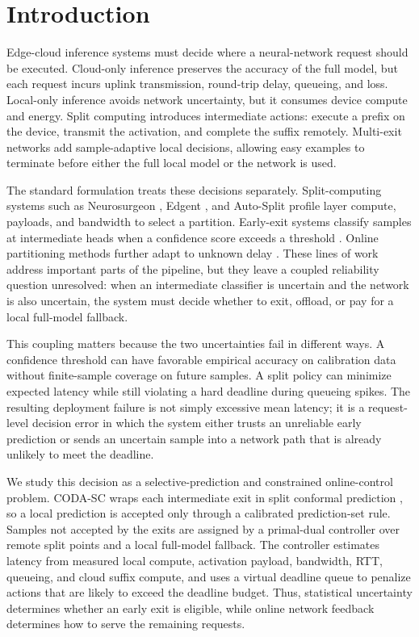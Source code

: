 \documentclass[11pt]{article}
\begin{document}
\section{Introduction}

Edge-cloud inference systems must decide where a neural-network request should
be executed. Cloud-only inference preserves the accuracy of the full model, but
each request incurs uplink transmission, round-trip delay, queueing, and loss.
Local-only inference avoids network uncertainty, but it consumes device compute
and energy. Split computing introduces intermediate actions: execute a prefix on
the device, transmit the activation, and complete the suffix remotely. Multi-exit
networks add sample-adaptive local decisions, allowing easy examples to terminate
before either the full local model or the network is used.

The standard formulation treats these decisions separately. Split-computing
systems such as Neurosurgeon \citep{kang2017neurosurgeon}, Edgent
\citep{li2019edgent}, and Auto-Split \citep{banitalebi2021autosplit} profile
layer compute, payloads, and bandwidth to select a partition. Early-exit systems
classify samples at intermediate heads when a confidence score exceeds a
threshold \citep{teerapittayanon2017ddnn, teerapittayanon2016branchynet,
matsubara2022split}. Online partitioning methods further adapt to unknown delay
\citep{saxena2025aodpart}. These lines of work address important parts of the
pipeline, but they leave a coupled reliability question unresolved: when an
intermediate classifier is uncertain and the network is also uncertain, the
system must decide whether to exit, offload, or pay for a local full-model
fallback.

This coupling matters because the two uncertainties fail in different ways. A
confidence threshold can have favorable empirical accuracy on calibration data
without finite-sample coverage on future samples. A split policy can minimize
expected latency while still violating a hard deadline during queueing spikes.
The resulting deployment failure is not simply excessive mean latency; it is a
request-level decision error in which the system either trusts an unreliable
early prediction or sends an uncertain sample into a network path that is already
unlikely to meet the deadline.

We study this decision as a selective-prediction and constrained online-control
problem. CODA-SC wraps each intermediate exit in split conformal prediction
\citep{angelopoulos2021gentle}, so a local prediction is accepted only through a
calibrated prediction-set rule. Samples not accepted by the exits are assigned by
a primal-dual controller over remote split points and a local full-model
fallback. The controller estimates latency from measured local compute,
activation payload, bandwidth, RTT, queueing, and cloud suffix compute, and uses a
virtual deadline queue to penalize actions that are likely to exceed the deadline
budget. Thus, statistical uncertainty determines whether an early exit is
eligible, while online network feedback determines how to serve the remaining
requests.
\end{document}
